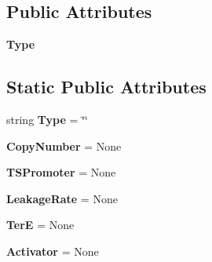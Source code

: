 \subsection*{Public Attributes}
\begin{DoxyCompactItemize}
\item 
\hypertarget{classweb_1_1_simulate___class_1_1_d_n_a___simulate_aa234468d2d8f7d04de55e93cb1ab0680}{{\bfseries Type}}\label{classweb_1_1_simulate___class_1_1_d_n_a___simulate_aa234468d2d8f7d04de55e93cb1ab0680}

\end{DoxyCompactItemize}
\subsection*{Static Public Attributes}
\begin{DoxyCompactItemize}
\item 
\hypertarget{classweb_1_1_simulate___class_1_1_d_n_a___simulate_a85da64f8805311e83467d99e2b4553a1}{string {\bfseries Type} = \char`\"{}\char`\"{}}\label{classweb_1_1_simulate___class_1_1_d_n_a___simulate_a85da64f8805311e83467d99e2b4553a1}

\item 
\hypertarget{classweb_1_1_simulate___class_1_1_d_n_a___simulate_a399330e85a7f32291f717b9eb846d080}{{\bfseries Copy\-Number} = None}\label{classweb_1_1_simulate___class_1_1_d_n_a___simulate_a399330e85a7f32291f717b9eb846d080}

\item 
\hypertarget{classweb_1_1_simulate___class_1_1_d_n_a___simulate_aea102d7a236466b4204e777bcbcfb1af}{{\bfseries T\-S\-Promoter} = None}\label{classweb_1_1_simulate___class_1_1_d_n_a___simulate_aea102d7a236466b4204e777bcbcfb1af}

\item 
\hypertarget{classweb_1_1_simulate___class_1_1_d_n_a___simulate_abc27d2561f40165607efd2b894fc18ef}{{\bfseries Leakage\-Rate} = None}\label{classweb_1_1_simulate___class_1_1_d_n_a___simulate_abc27d2561f40165607efd2b894fc18ef}

\item 
\hypertarget{classweb_1_1_simulate___class_1_1_d_n_a___simulate_af4973b509128336acfee906693d6af4b}{{\bfseries Ter\-E} = None}\label{classweb_1_1_simulate___class_1_1_d_n_a___simulate_af4973b509128336acfee906693d6af4b}

\item 
\hypertarget{classweb_1_1_simulate___class_1_1_d_n_a___simulate_ae298041c1b536e5ab369dff6cd3bac76}{{\bfseries Activator} = None}\label{classweb_1_1_simulate___class_1_1_d_n_a___simulate_ae298041c1b536e5ab369dff6cd3bac76}


\end{DoxyCompactItemize}
